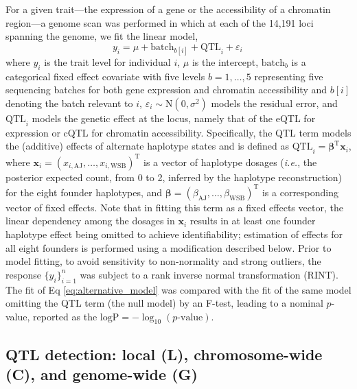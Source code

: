 \documentclass[10pt,letterpaper]{article}
\newcommand{\ie}{\emph{i.e.}\xspace}
\newcommand{\T}{^\mathrm{T}}
\newcommand{\bbeta}{\boldsymbol{\beta}}
\newcommand{\bx}{\mathbf{x}}
\begin{document}
For a given trait---the expression of a gene or the accessibility of a chromatin region---a genome scan was performed in which at each of the 14,191 loci spanning the genome, we fit the linear model,
\begin{equation}
  y_i = \mu + \text{batch}_{b[i]} + \text{QTL}_i + \varepsilon_i\, 
  \label{eq:alternative_model}
\end{equation}
where $y_{i}$ is the trait level for individual $i$, $\mu$ is the intercept, $\text{batch}_b$ is a categorical fixed effect covariate with five levels $b=1,\dots,5$ representing five sequencing batches for both gene expression and chromatin accessibility and $b[i]$ denoting the batch relevant to $i$, $\varepsilon_i\sim\text{N}(0,\sigma^2)$ models the residual error, and $\text{QTL}_{i}$ models the genetic effect at the locus, namely that of the eQTL for expression or cQTL for chromatin accessibility. Specifically, the QTL term models the (additive) effects of alternate haplotype states and is defined as $\text{QTL}_{i}=\bbeta\T\bx_i$, where $\bx_i=(x_{i,\text{AJ}},\dots,x_{i,\text{WSB}})\T$ is a vector of haplotype dosages (\ie, the posterior expected count, from 0 to 2, inferred by the haplotype reconstruction) for the eight founder haplotypes, and $\bbeta=(\beta_\text{AJ},\dots,\beta_\text{WSB})\T$ is a corresponding vector of fixed effects. Note that in fitting this term as a fixed effects vector, the linear dependency among the dosages in $\bx_i$ results in at least one founder haplotype effect being omitted to achieve identifiability; estimation of effects for all eight founders is performed using a modification described below. Prior to model fitting, to avoid sensitivity to non-normality and strong outliers, the response $\{y_i\}^n_{i=1}$ was subject to a rank inverse normal transformation (RINT).
The fit of Eq \ref{eq:alternative_model} was compared with the fit of the same model omitting the QTL term (the null model) by an F-test, leading to a nominal $p$-value, reported as the $\text{logP}=-\log_{10}(\text{$p$-value})$. %

\subsection*{QTL detection: local (L), chromosome-wide (C), and genome-wide (G)}
\end{document}
